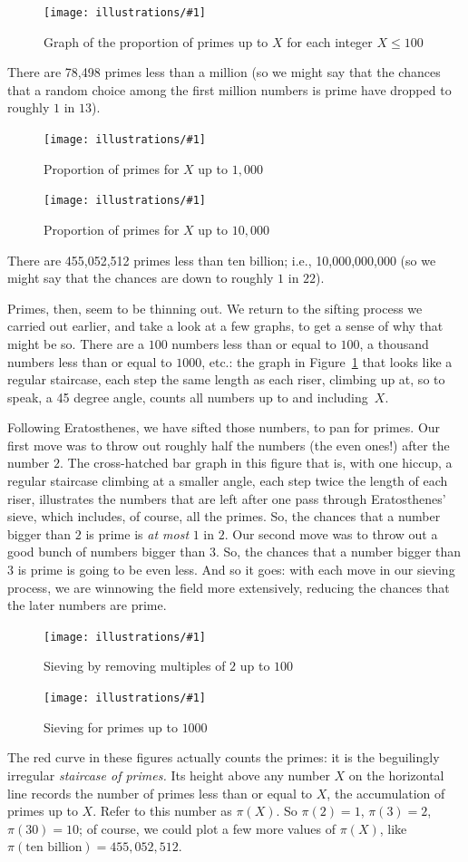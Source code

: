 \documentclass[openany]{book}
\newcommand{\ill}[3]{%
   \begin{figure}[H]%
   \vspace{-2ex}
   \centering%
   \texttt{[image: illustrations/\#1]}%
   \caption{#3}%
   \vspace{-2ex}
    \end{figure}}
\theoremstyle{plain}
\theoremstyle{definition}
\begin{document}
\ill{proportion_primes_100}{1}{Graph of the proportion of primes up to $X$ for each integer $X\leq 100$}

There are 78,498 primes less than a million (so we might say that
the chances that a random choice among the first million numbers is
prime have dropped to roughly $1$ in $13$).

\ill{proportion_primes_1000}{1}{Proportion of primes for $X$ up to $1{,}000$}
\ill{proportion_primes_10000}{1}{Proportion of primes for $X$ up to $10{,}000$}

There are 455,052,512 primes less than ten billion; i.e.,
10{,}000{,}000{,}000 (so we might say that the chances are down to roughly
$1$ in $22$).

Primes, then, seem to be thinning out.  We return to the sifting process
we carried out earlier, and take a look at a few graphs, to get a sense of why
that might be so. There are a $100$ numbers less than or equal to
$100$, a thousand numbers less than or equal to $1000$, etc.: the
graph in Figure~\ref{fig:sieve_2_100} that looks like a regular staircase, each step the
same length as each riser, climbing up at, so to speak, a 45 degree
angle, counts all numbers up to and including~$X$.

Following Eratosthenes, we have sifted those numbers, to pan for
primes. Our first move was to throw out roughly half the numbers (the
even ones!) after the number $2$. The cross-hatched bar graph in this
figure that is, with one hiccup, a regular staircase climbing at a
smaller angle, each step twice the length of each riser, illustrates
the numbers that are left after one pass through Eratosthenes' sieve,
which includes, of course, all the primes. So, the chances that a
number bigger than $2$ is prime is {\em at most} $1$ in $2$.  Our
second move was to throw out a good bunch of numbers bigger than $3$.
So, the chances that a number bigger than $3$ is prime is going to be
even less.  And so it goes: with each move in our
sieving process, we are winnowing the field more extensively, reducing
the chances that the later numbers are prime.

\ill{sieve_2_100}{.9}{Sieving by removing multiples of $2$ up to $100$\label{fig:sieve_2_100}}
\ill{sieve1000}{.9}{Sieving for primes up to $1000$}

The red curve in these figures actually counts the primes: it is the
beguilingly irregular {\em staircase of primes.}  Its height above any
number $X$ on the horizontal line records the number of primes less
than or equal to $X$, the accumulation of primes up to $X$.  Refer to
this number as $\pi(X)$. So $\pi(2)=1$, $\pi(3) = 2$, $\pi(30) = 10$;
of course, we could plot a few more values of $\pi(X)$, like
$\pi(\text{ten billion}) = 455,052,512$.
\end{document}
